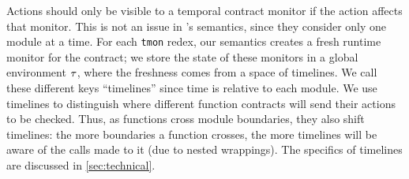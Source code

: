 Actions should only be visible to a temporal contract monitor if the action affects that monitor.
%
This is not an issue in \dfm's semantics, since they consider only one module at a time.
%
For each {\tt tmon} redex, our semantics creates a fresh runtime monitor for the contract; we store the state of these monitors in a global environment $\tau$, where the freshness comes from a space of timelines.
%
We call these different keys ``timelines'' since time is relative to each module.
%
We use timelines to distinguish where different function contracts will send their actions to be checked.
%
Thus, as functions cross module boundaries, they also shift timelines: the more boundaries a function crosses, the more timelines will be aware of the calls made to it (due to nested wrappings).
%
The specifics of timelines are discussed in \autoref{sec:technical}.

